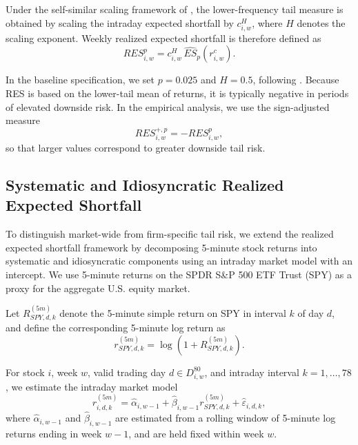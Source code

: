 \documentclass[11pt,a4paper]{article}
\begin{document}
Under the self-similar scaling framework of
\citet{Dimitriadis03072022}, the lower-frequency tail measure is
obtained by scaling the intraday expected shortfall by \(c_{i,w}^{H}\),
where \(H\) denotes the scaling exponent. Weekly realized expected
shortfall is therefore defined as
\begin{equation}
RES_{i,w}^{p}
=
c_{i,w}^{H}\,\widehat{ES}_{p}(r_{i,w}^{c}).
\label{eq:res}
\end{equation}

In the baseline specification, we set \(p=0.025\) and \(H=0.5\),
following \citet{Dimitriadis03072022}. Because RES is based on the
lower-tail mean of returns, it is typically negative in periods of
elevated downside risk. In the empirical analysis, we use the sign-adjusted measure
\begin{equation}
RES_{i,w}^{+,p}=-RES_{i,w}^{p},
\label{eq:res_adj}
\end{equation}
so that larger values correspond to greater downside tail risk.

\subsection{Systematic and Idiosyncratic Realized Expected Shortfall}

To distinguish market-wide from firm-specific tail risk, we extend the
realized expected shortfall framework by decomposing 5-minute stock
returns into systematic and idiosyncratic components using an intraday
market model with an intercept. We use 5-minute returns on the SPDR
S\&P 500 ETF Trust (SPY) as a proxy for the aggregate U.S. equity
market.

Let \(R_{SPY,d,k}^{(5m)}\) denote the 5-minute simple return on SPY in
interval \(k\) of day \(d\), and define the corresponding 5-minute log
return as
\begin{equation}
r_{SPY,d,k}^{(5m)}=\log\!\left(1+R_{SPY,d,k}^{(5m)}\right).
\label{eq:spy_logret}
\end{equation}

For stock \(i\), week \(w\), valid trading day \(d\in D^{80}_{i,w}\),
and intraday interval \(k=1,\dots,78\), we estimate the intraday market
model
\begin{equation}
r_{i,d,k}^{(5m)}
=
\hat{\alpha}_{i,w-1}
+
\hat{\beta}_{i,w-1}r_{SPY,d,k}^{(5m)}
+
\hat{\varepsilon}_{i,d,k},
\label{eq:market_model}
\end{equation}
where \(\hat{\alpha}_{i,w-1}\) and \(\hat{\beta}_{i,w-1}\) are estimated
from a rolling window of 5-minute log returns ending in week \(w-1\),
and are held fixed within week \(w\).
\end{document}
